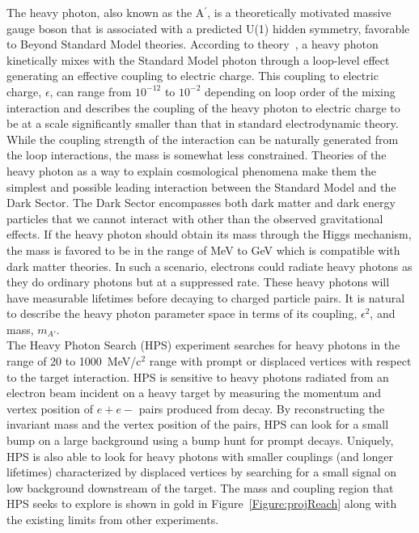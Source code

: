 The heavy photon, also known as the A$^{\prime}$, is a theoretically motivated massive gauge boson that is associated with a predicted U(1) hidden symmetry, favorable to Beyond Standard Model theories. According to theory~\cite{Holdom0}, a heavy photon kinetically mixes with the Standard Model photon through a loop-level effect generating an effective coupling to electric charge. This coupling to electric charge, $\epsilon$, can range from $10^{-12}$ to $10^{-2}$ depending on loop order of the mixing interaction and describes the coupling of the heavy photon to electric charge to be at a scale significantly smaller than that in standard electrodynamic theory. While the coupling strength of the interaction can be naturally generated from the loop interactions, the mass is somewhat less constrained. Theories of the heavy photon as a way to explain cosmological phenomena make them the simplest and possible leading interaction between the Standard Model and the Dark Sector. The Dark Sector encompasses both dark matter and dark energy particles that we cannot interact with other than the observed gravitational effects. If the heavy photon should obtain its mass through the Higgs mechanism, the mass is favored to be in the range of MeV to GeV which is compatible with dark matter theories. In such a scenario, electrons could radiate heavy photons as they do ordinary photons but at a suppressed rate. These heavy photons will have measurable lifetimes before decaying to charged particle pairs. It is natural to describe the heavy photon parameter space in terms of its coupling, $\epsilon^2$, and mass, $m_{A'}$. \\
\indent The Heavy Photon Search (HPS) experiment searches for heavy photons in the range of 20 to 1000~MeV/c$^2$ range with prompt or displaced vertices with respect to the target interaction. HPS is sensitive to heavy photons radiated from an electron beam incident on a heavy target by measuring the momentum and vertex position of $e+e-$ pairs produced from decay. By reconstructing the invariant mass and the vertex position of the pairs, HPS can look for a small bump on a large background using a bump hunt for prompt decays. Uniquely, HPS is also able to look for heavy photons with smaller couplings (and longer lifetimes) characterized by displaced vertices by searching for a small signal on low background downstream of the target. The mass and coupling region that HPS seeks to explore is shown in gold in Figure~\ref{Figure:projReach} along with the existing limits from other experiments. 

